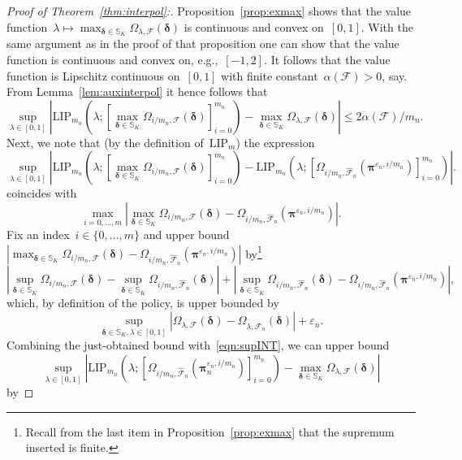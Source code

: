 \documentclass[11pt, a4paper]{article}
\theoremstyle{definition}
\begin{document}
\begin{proof}[Proof of Theorem~\ref{thm:interpol}:]
Proposition~\ref{prop:exmax} shows that the value function~$\lambda \mapsto \max_{\bm{\delta} \in \mathbb{S}_K} \Omega_{\lambda, \mathcal{F}}(\bm{\delta})$ is continuous and convex on~$[0, 1]$. With the same argument as in the proof of that proposition one can show that the value function is continuous and convex on, e.g.,~$[-1, 2]$. It follows that the value function is Lipschitz continuous on~$[0, 1]$ with finite constant~$\alpha(\mathcal{F}) > 0$, say. From Lemma~\ref{lem:auxinterpol} it hence follows that 
\begin{equation}\label{eqn:supINT}
\sup_{\lambda \in [0, 1]}\left|\mathrm{LIP}_{m_n}\left(\lambda; \left[\max_{\bm{\delta} \in \mathbb{S}_K} \Omega_{i/m_n, \mathcal{F}}(\bm{\delta})\right]_{i = 0}^{m_n}\right) - \max_{\bm{\delta} \in \mathbb{S}_K} \Omega_{\lambda, \mathcal{F}}(\bm{\delta})\right| \leq 2\alpha(\mathcal{F})/m_n.
\end{equation}
%
Next, we note that (by the definition of~$\mathrm{LIP}_{m}$) the expression
%
\begin{equation}\label{eqn:tsinterpol}
\sup_{\lambda \in [0, 1]}\left|\mathrm{LIP}_{m_n}\left(\lambda; \left[\max_{\bm{\delta} \in \mathbb{S}_K} \Omega_{i/m_n, \mathcal{F}}(\bm{\delta})\right]_{i = 0}^{m_n}\right) - \mathrm{LIP}_{m_n}\left(\lambda; \left[\Omega_{i/m_n, \hat{\mathcal{F}}_n}(\bm{\pi}^{\varepsilon_n, i/m_n})\right]_{i = 0}^{m_n}\right)\right|.
\end{equation}
%
coincides with~$$\max_{i = 0, \hdots, m} \left| \max_{\bm{\delta} \in \mathbb{S}_K} \Omega_{i/m_n, \mathcal{F}}(\bm{\delta})  - \Omega_{i/m_n, \hat{\mathcal{F}}_n}(\bm{\pi}^{\varepsilon_n, i/m_n}) \right|.$$ Fix an index~$i \in \{0, \hdots, m\}$ and upper bound~$| \max_{\bm{\delta} \in \mathbb{S}_K} \Omega_{i/m_n, \mathcal{F}}(\bm{\delta})  - \Omega_{i/m_n, \hat{\mathcal{F}}_n}(\bm{\pi}^{\varepsilon_n, i/m_n}) |$ by\footnote{Recall from the last item in Proposition~\ref{prop:exmax} that the supremum inserted is finite.} $$\left| \sup_{\bm{\delta} \in \mathbb{S}_K} \Omega_{i/m_n, \mathcal{F}}(\bm{\delta})  - \sup_{\bm{\delta} \in \mathbb{S}_K} \Omega_{i/m_n, \hat{\mathcal{F}}_n}(\bm{\delta})\right| + \left| \sup_{\bm{\delta} \in \mathbb{S}_K} \Omega_{i/m_n, \hat{\mathcal{F}}_n}(\bm{\delta}) -  \Omega_{i/m_n, \hat{\mathcal{F}}_n}(\bm{\pi}^{\varepsilon_n, i/m_n}) \right|,$$ which, by definition of the policy, is upper bounded by $$ \sup_{\bm{\delta} \in \mathbb{S}_K, \lambda \in [0, 1]} |\Omega_{\lambda, \mathcal{F}}(\bm{\delta}) - \Omega_{\lambda, \hat{\mathcal{F}}_n}(\bm{\delta}) | + \varepsilon_n.$$ Combining the just-obtained bound with~\eqref{eqn:supINT}, we can upper bound $$\sup_{\lambda \in [0, 1]}\left|\mathrm{LIP}_{m_n}\left(\lambda; \left[\Omega_{i/m_n, \hat{\mathcal{F}}_n}(\bm{\pi}_n^{\varepsilon_n, i/m_n})\right]_{i = 0}^{m_n}\right) - \max_{\bm{\delta} \in \mathbb{S}_K} \Omega_{\lambda, \mathcal{F}}(\bm{\delta})\right|$$ by

\end{proof}
\end{document}
